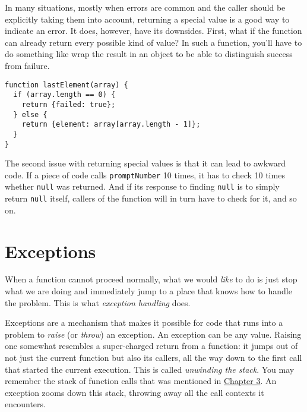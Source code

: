 In many situations, mostly when errors are common and the caller should be explicitly taking them into account, returning a special value is a good way to indicate an error. It does, however, have its downsides. First, what if the function can already return every possible kind of value? In such a function, you'll have to do something like wrap the result in an object to be able to distinguish success from failure.

\begin{lstlisting}
function lastElement(array) {
  if (array.length == 0) {
    return {failed: true};
  } else {
    return {element: array[array.length - 1]};
  }
}
\end{lstlisting}
\noindent{}

The second issue with returning special values is that it can lead to awkward code. If a piece of code calls \lstinline`promptNumber` 10 times, it has to check 10 times whether \lstinline`null` was returned. And if its response to finding \lstinline`null` is to simply return \lstinline`null` itself, callers of the function will in turn have to check for it, and so on.

\section{Exceptions}

When a function cannot proceed normally, what we would \emph{like} to do is just stop what we are doing and immediately jump to a place that knows how to handle the problem. This is what \emph{exception handling} does.

Exceptions are a mechanism that makes it possible for code that runs into a problem to \emph{raise} (or \emph{throw}) an exception. An exception can be any value. Raising one somewhat resembles a super-charged return from a function: it jumps out of not just the current function but also its callers, all the way down to the first call that started the current execution. This is called \emph{unwinding the
stack}. You may remember the stack of function calls that was mentioned in \hyperref[functions.stack]{Chapter 3}. An exception zooms down this stack, throwing away all the call contexts it encounters.

